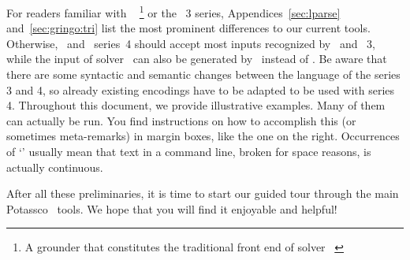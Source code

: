 
For readers familiar with \lparse~\cite{lparseManual}%
\footnote{A grounder that constitutes the traditional front end of solver \smodels~\cite{siniso02a}}
or the \gringo~3 series,
Appendices~\ref{sec:lparse} and~\ref{sec:gringo:tri}
list the most prominent differences to our current tools.
Otherwise, \gringo\ and \clingo\ series~4 should accept most inputs recognized by \lparse\ and \gringo~3,
while the input of solver \clasp\ can also be generated by \lparse\ instead of \gringo.
Be aware that there are some syntactic and semantic changes between the language of the series 3 and 4,
so already existing encodings have to be adapted to be used with series 4.
Throughout this document, we provide illustrative examples.
Many of them can actually be run. 
You find instructions on how to accomplish this
(or sometimes meta-remarks)
in margin boxes, like the one on the right.
Occurrences of `'
usually mean that text in a command line, broken for space reasons, is actually continuous.

After all these preliminaries, it is time to start our guided tour
through the main Potassco~\cite{potassco} tools.
We hope that you will find it enjoyable and helpful!

